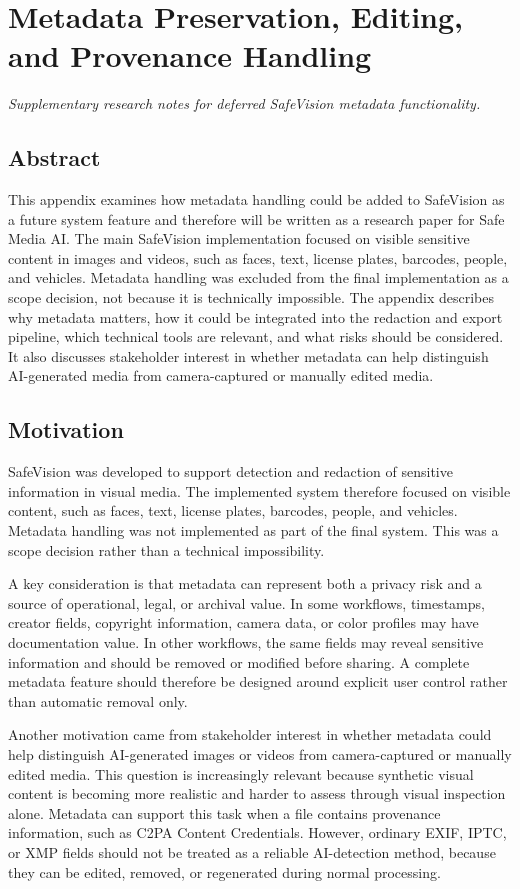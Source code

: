 \chapter{Metadata Preservation, Editing, and Provenance Handling}
\label{app:metadata-handling}

\textit{Supplementary research notes for deferred SafeVision metadata functionality.}

\section*{Abstract}
This appendix examines how metadata handling could be added to SafeVision as a future system feature and therefore will be written as a research paper for Safe Media AI. The main SafeVision implementation focused on visible sensitive content in images and videos, such as faces, text, license plates, barcodes, people, and vehicles. Metadata handling was excluded from the final implementation as a scope decision, not because it is technically impossible. The appendix describes why metadata matters, how it could be integrated into the redaction and export pipeline, which technical tools are relevant, and what risks should be considered. It also discusses stakeholder interest in whether metadata can help distinguish AI-generated media from camera-captured or manually edited media.

\section{Motivation}
SafeVision was developed to support detection and redaction of sensitive information in visual media. The implemented system therefore focused on visible content, such as faces, text, license plates, barcodes, people, and vehicles. Metadata handling was not implemented as part of the final system. This was a scope decision rather than a technical impossibility.

A key consideration is that metadata can represent both a privacy risk and a source of operational, legal, or archival value. In some workflows, timestamps, creator fields, copyright information, camera data, or color profiles may have documentation value. In other workflows, the same fields may reveal sensitive information and should be removed or modified before sharing. A complete metadata feature should therefore be designed around explicit user control rather than automatic removal only.

Another motivation came from stakeholder interest in whether metadata could help distinguish AI-generated images or videos from camera-captured or manually edited media. This question is increasingly relevant because synthetic visual content is becoming more realistic and harder to assess through visual inspection alone. Metadata can support this task when a file contains provenance information, such as C2PA Content Credentials. However, ordinary EXIF, IPTC, or XMP fields should not be treated as a reliable AI-detection method, because they can be edited, removed, or regenerated during normal processing.

